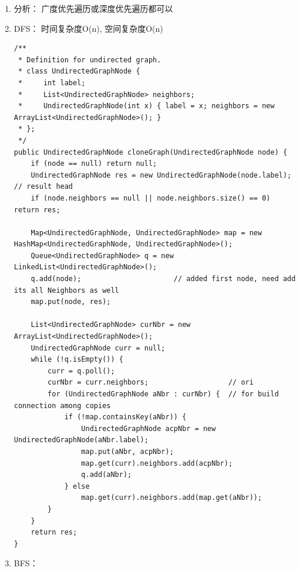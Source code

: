 \documentclass[12pt]{book}
\begin{document}
\begin{enumerate}
\item 分析： 广度优先遍历或深度优先遍历都可以
\label{sec-18-1-1-1}
\item DFS： 时间复杂度O(n), 空间复杂度O(n)
\label{sec-18-1-1-2}
\lstset{language=java,label= ,caption= ,numbers=none}
\begin{lstlisting}
/**
 * Definition for undirected graph.
 * class UndirectedGraphNode {
 *     int label;
 *     List<UndirectedGraphNode> neighbors;
 *     UndirectedGraphNode(int x) { label = x; neighbors = new ArrayList<UndirectedGraphNode>(); }
 * };
 */
public UndirectedGraphNode cloneGraph(UndirectedGraphNode node) {
    if (node == null) return null;
    UndirectedGraphNode res = new UndirectedGraphNode(node.label);  // result head
    if (node.neighbors == null || node.neighbors.size() == 0) return res;

    Map<UndirectedGraphNode, UndirectedGraphNode> map = new HashMap<UndirectedGraphNode, UndirectedGraphNode>();
    Queue<UndirectedGraphNode> q = new LinkedList<UndirectedGraphNode>();
    q.add(node);                      // added first node, need add its all Neighbors as well
    map.put(node, res);

    List<UndirectedGraphNode> curNbr = new ArrayList<UndirectedGraphNode>();
    UndirectedGraphNode curr = null;
    while (!q.isEmpty()) {
        curr = q.poll();
        curNbr = curr.neighbors;                   // ori
        for (UndirectedGraphNode aNbr : curNbr) {  // for build connection among copies
            if (!map.containsKey(aNbr)) {
                UndirectedGraphNode acpNbr = new UndirectedGraphNode(aNbr.label);
                map.put(aNbr, acpNbr);
                map.get(curr).neighbors.add(acpNbr);
                q.add(aNbr);
            } else
                map.get(curr).neighbors.add(map.get(aNbr));                        
        }
    }
    return res;
}
\end{lstlisting}
\item BFS：
\label{sec-18-1-1-3}
\end{enumerate}
\end{document}
